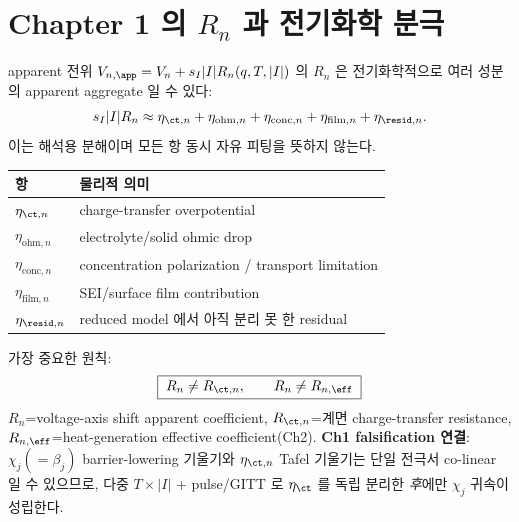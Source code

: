 \section{Chapter 1 의 $R_n$ 과 전기화학 분극}\label{sec:ch3_Rn}
apparent 전위 $V_{n,\app}=V_n+s_I|I|R_n(q,T,|I|)$ 의 $R_n$ 은 전기화학적으로 여러 성분의 apparent
aggregate 일 수 있다:
\begin{equation}
s_I|I|R_n\approx\eta_{\ct,n}+\eta_{\mathrm{ohm},n}+\eta_{\mathrm{conc},n}+\eta_{\mathrm{film},n}+\eta_{\resid,n}.
\label{eq:ch3_Rn_decomp}
\end{equation}
이는 해석용 분해이며 모든 항 동시 자유 피팅을 뜻하지 않는다.
\begin{longtable}{p{} p{}}
\toprule 항 & 물리적 의미 \\ \midrule \endhead
$\eta_{\ct,n}$ & charge-transfer overpotential \\
$\eta_{\mathrm{ohm},n}$ & electrolyte/solid ohmic drop \\
$\eta_{\mathrm{conc},n}$ & concentration polarization / transport limitation \\
$\eta_{\mathrm{film},n}$ & SEI/surface film contribution \\
$\eta_{\resid,n}$ & reduced model 에서 아직 분리 못 한 residual \\
\bottomrule
\end{longtable}
가장 중요한 원칙:
\begin{equation}
\boxed{\;R_n\ne R_{\ct,n},\qquad R_n\ne R_{n,\eff}\;}
\label{eq:ch3_Rn_not_equal}
\end{equation}
$R_n$=voltage-axis shift apparent coefficient, $R_{\ct,n}$=계면 charge-transfer resistance,
$R_{n,\eff}$=heat-generation effective coefficient(Ch2). \textbf{Ch1 falsification 연결}: $\chi_j(=\beta_j)$
barrier-lowering 기울기와 $\eta_{\ct,n}$ Tafel 기울기는 단일 전극서 co-linear 일 수 있으므로, 다중
$T\times|I|$ + pulse/GITT 로 $\eta_{\ct}$ 를 독립 분리한 \emph{후}에만 $\chi_j$ 귀속이 성립한다.

